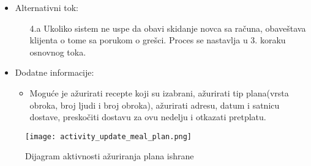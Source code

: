 \begin{itemize}
    \item Alternativni tok:
        \begin{itemize}
            \item[4.a] Ukoliko sistem ne uspe da obavi skidanje novca sa računa, obaveštava klijenta o tome sa porukom o grešci. Proces se nastavlja u 3. koraku osnovnog toka.
        \end{itemize}
    \item Dodatne informacije:
        \begin{itemize}
            \item Moguće je ažurirati recepte koji su izabrani, ažurirati tip plana(vrsta obroka, broj ljudi i broj obroka), ažurirati adresu, datum i satnicu dostave, preskočiti dostavu za ovu nedelju i otkazati pretplatu. 
        \end{itemize}
\end{itemize}

\begin{figure}[H]
\begin{center}
\texttt{[image: activity\_update\_meal\_plan.png]}
\end{center}
    \caption{Dijagram aktivnosti ažuriranja plana ishrane}
\label{fig:ActivityUpdateMealPlan}
\end{figure}
